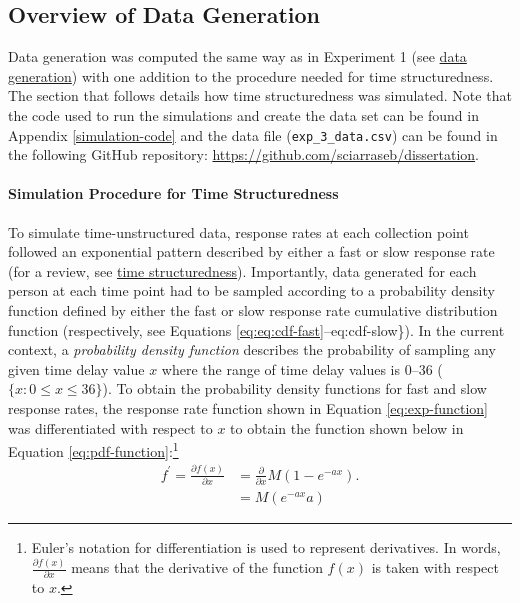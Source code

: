 \documentclass[
12pt, %
twoside,
english]{guelphthesis}
\begin{document}
\hypertarget{overview-of-data-generation-1}{%
\subsection{Overview of Data Generation}\label{overview-of-data-generation-1}}

Data generation was computed the same way as in Experiment 1 (see \protect\hyperlink{data-generation}{data generation}) with one addition to the procedure needed for time structuredness. The section that follows details how time structuredness was simulated. Note that the code used to run the simulations and create the data set can be found in Appendix \ref{simulation-code} and the data file (\texttt{exp\_3\_data.csv}) can be found in the following GitHub repository: \url{https://github.com/sciarraseb/dissertation}.

\hypertarget{simulating-time-struc}{%
\paragraph{Simulation Procedure for Time Structuredness}\label{simulating-time-struc}}

To simulate time-unstructured data, response rates at each collection
point followed an exponential pattern described by either a fast or slow
response rate (for a review, see \protect\hyperlink{time-structuredness}{time structuredness}). Importantly, data generated
for each person at each time point had to be sampled according to a
probability density function defined by either the fast or slow response
rate cumulative distribution function (respectively, see Equations \ref{eq:eq:cdf-fast}--eq:cdf-slow\}). In the current context, a
\emph{probability density function} describes the probability of sampling
any given time delay value \(x\) where the range of time delay values is
0--36 (\(\{x : 0 \le x \le 36 \}\)). To obtain the probability density functions
for fast and slow response rates, the response rate function shown in
Equation \eqref{eq:exp-function} was differentiated with respect to \(x\) to
obtain the function shown below in Equation \ref{eq:pdf-function}:\footnote{Euler's notation for differentiation is used to represent derivatives. In words, $\frac{\partial f(x)}{\partial x}$ means that the derivative of the function $f(x)$ is taken with respect to $x$.}
\begin{align}
f^\prime = \frac{\partial f(x)}{\partial x} &= \frac{\partial}{\partial x}M(1 - e^{-ax}). \nonumber \\
&= M (e^{-ax}a)
\label{eq:pdf-function}
\end {align}
\end{document}
